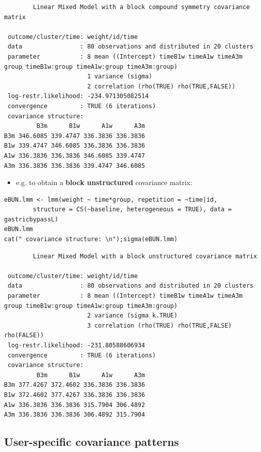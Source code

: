 \documentclass[12pt]{article}
\begin{document}
\begin{verbatim}
		Linear Mixed Model with a block compound symmetry covariance matrix 

 outcome/cluster/time: weight/id/time 
 data                : 80 observations and distributed in 20 clusters 
 parameter           : 8 mean ((Intercept) timeB1w timeA1w timeA3m group timeB1w:group timeA1w:group timeA3m:group) 
                       1 variance (sigma) 
                       2 correlation (rho(TRUE) rho(TRUE,FALSE)) 
 log-restr.likelihood: -234.971305082514 
 convergence         : TRUE (6 iterations)
 covariance structure: 
         B3m      B1w      A1w      A3m
B3m 346.6085 339.4747 336.3836 336.3836
B1w 339.4747 346.6085 336.3836 336.3836
A1w 336.3836 336.3836 346.6085 339.4747
A3m 336.3836 336.3836 339.4747 346.6085
\end{verbatim}

\begin{itemize}
\item e.g. to obtain a \textbf{block unstructured} covariance matrix:
\end{itemize}
\lstset{language=r,label= ,caption= ,captionpos=b,numbers=none}
\begin{lstlisting}
eBUN.lmm <- lmm(weight ~ time*group, repetition = ~time|id,
		structure = CS(~baseline, heterogeneous = TRUE), data = gastricbypassL)
eBUN.lmm
cat(" covariance structure: \n");sigma(eBUN.lmm)
\end{lstlisting}

\begin{verbatim}
		Linear Mixed Model with a block unstructured covariance matrix 

 outcome/cluster/time: weight/id/time 
 data                : 80 observations and distributed in 20 clusters 
 parameter           : 8 mean ((Intercept) timeB1w timeA1w timeA3m group timeB1w:group timeA1w:group timeA3m:group) 
                       2 variance (sigma k.TRUE) 
                       3 correlation (rho(TRUE) rho(TRUE,FALSE) rho(FALSE)) 
 log-restr.likelihood: -231.80588606934 
 convergence         : TRUE (6 iterations)
 covariance structure: 
         B3m      B1w      A1w      A3m
B3m 377.4267 372.4602 336.3836 336.3836
B1w 372.4602 377.4267 336.3836 336.3836
A1w 336.3836 336.3836 315.7904 306.4892
A3m 336.3836 336.3836 306.4892 315.7904
\end{verbatim}

\clearpage

\subsection{User-specific covariance patterns}
\label{sec:orgc4998f7}
\end{document}
